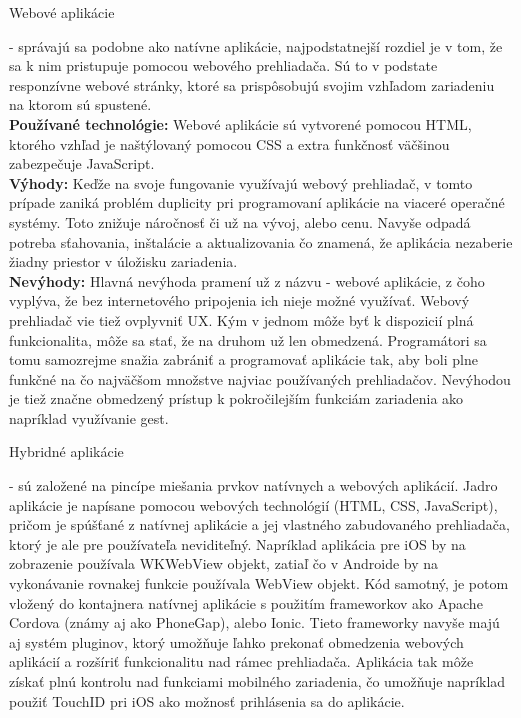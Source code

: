 \begin{itemize}[leftmargin=*]
{\bf \item Webové aplikácie} - správajú sa podobne ako natívne aplikácie, najpodstatnejší rozdiel je v tom, že sa k nim pristupuje pomocou webového prehliadača. Sú to v podstate responzívne webové stránky, ktoré sa prispôsobujú svojim vzhľadom zariadeniu na ktorom sú spustené. \\

{\bf Používané technológie:} Webové aplikácie sú vytvorené pomocou HTML, ktorého vzhľad je naštýlovaný pomocou CSS a extra funkčnosť väčšinou zabezpečuje JavaScript. \\

{\bf Výhody:} Keďže na svoje fungovanie využívajú webový prehliadač, v tomto prípade zaniká problém duplicity pri programovaní aplikácie na viaceré operačné systémy. Toto znižuje náročnosť či už na vývoj, alebo cenu. Navyše odpadá potreba sťahovania, inštalácie a aktualizovania čo znamená, že aplikácia nezaberie žiadny priestor v úložisku zariadenia.  \\
 
{\bf Nevýhody:}  Hlavná nevýhoda pramení už z názvu - webové aplikácie, z čoho vyplýva, že bez internetového pripojenia ich nieje možné využívať. Webový prehliadač vie tiež ovplyvniť UX. Kým v jednom môže byť k dispozicií plná funkcionalita, môže sa stať, že na druhom už len obmedzená. Programátori sa tomu samozrejme snažia zabrániť a programovať aplikácie tak, aby boli plne funkčné na čo najväčšom množstve najviac používaných prehliadačov. Nevýhodou je tiež značne obmedzený prístup k pokročilejším funkciám zariadenia ako napríklad využívanie gest. \\
 
{\bf \item Hybridné aplikácie} - sú založené na pincípe miešania prvkov natívnych a webových aplikácií. Jadro aplikácie je napísane pomocou webových technológií (HTML, CSS, JavaScript), pričom je spúšťané z natívnej aplikácie a jej vlastného zabudovaného prehliadača, ktorý je ale pre používateľa neviditeľný. Napríklad aplikácia pre iOS by na zobrazenie používala WKWebView objekt, zatiaľ čo v Androide by na vykonávanie rovnakej funkcie používala WebView objekt. Kód samotný, je potom vložený do kontajnera natívnej aplikácie s použitím frameworkov ako Apache Cordova (známy aj ako PhoneGap), alebo Ionic. Tieto frameworky navyše majú aj systém pluginov, ktorý umožňuje ľahko prekonať obmedzenia webových aplikácií a rozšíriť funkcionalitu nad rámec prehliadača. Aplikácia tak môže získať plnú kontrolu nad funkciami mobilného zariadenia, čo umožňuje napríklad použiť TouchID pri iOS ako možnosť prihlásenia sa do aplikácie.\\



\end{itemize}
